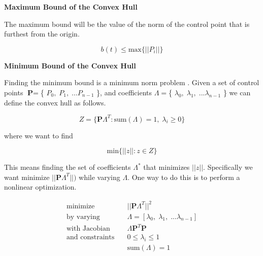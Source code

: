 \documentclass{article}
\begin{document}
\textbf{Maximum Bound of the Convex Hull}

\hspace{1cm}

 The maximum bound will be the value of the norm of the control point that is furthest from the origin.

    \begin{equation}
        b(t) \leq \text{max} \{||P_i||\}
    \end{equation}
    
\hspace{1cm}

\textbf{Minimum Bound of the Convex Hull}

\hspace{1cm}
    
Finding the minimum bound is a minimum norm problem \cite{ARTICLE:Kaown}. Given a set of control points \(\textbf{P} = \)\{ \(P_0, \; P_1, \; ... P_{n-1}\) \}, and coefficients \(\Lambda = \)\{ \(\lambda_0, \; \lambda_1, \; ... \lambda_{n-1}\) \} we can define the convex hull as follows.

\begin{equation}
    Z = \{ \textbf{P} \Lambda^{T} : \text{sum}(\Lambda) = 1,\; \lambda_{i} \geq 0\}
\end{equation}

where we want to find

\begin{equation}
    \text{min}\{||z|| : z \in Z\}
\end{equation}

This means finding the set of coefficients \(\Lambda^*\) that minimizes \(||z||\). Specifically we want minimize \(||\textbf{P} \Lambda^{T}||)\) while varying \(\Lambda\). One way to do this is to perform a nonlinear optimization.

\begin{equation}
\begin{aligned}
    \text{minimize} & \quad ||\textbf{P} \Lambda^{T}||^2 \\
    \text{by varying} &  \quad  \Lambda = [\lambda_0, \; \lambda_1, \; ... \lambda_{n-1}] \\
    \text{with Jacobian} & \quad \Lambda\textbf{P}^{T}\textbf{P} \\
    \text{and constraints} & \quad 0 \leq \lambda_i \leq 1 \\
     & \quad \text{sum}(\Lambda) = 1
\end{aligned}
\end{equation}
\end{document}
